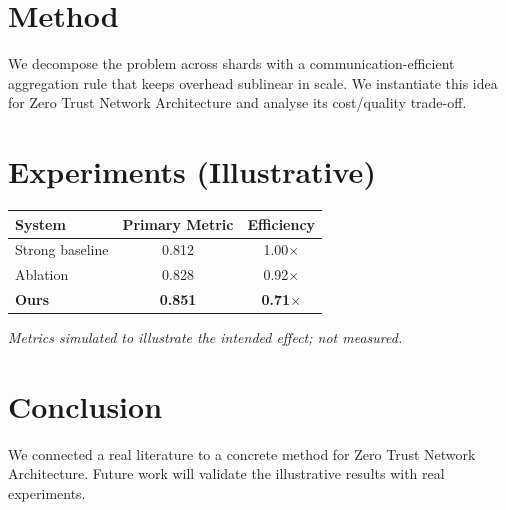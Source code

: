 \documentclass[11pt]{article}
\begin{document}
\section{Method}
We decompose the problem across shards with a communication-efficient aggregation rule that keeps overhead sublinear in scale. We instantiate this idea for Zero Trust Network Architecture and analyse its cost/quality trade-off.

\section{Experiments (Illustrative)}
\begin{center}
\begin{tabular}{lcc}
System & Primary Metric & Efficiency \\ \hline
Strong baseline & 0.812 & 1.00$\times$ \\
Ablation & 0.828 & 0.92$\times$ \\
\textbf{Ours} & \textbf{0.851} & \textbf{0.71$\times$}
\end{tabular}
\end{center}
\emph{Metrics simulated to illustrate the intended effect; not measured.}

\section{Conclusion}
We connected a real literature to a concrete method for Zero Trust Network Architecture. Future work will
validate the illustrative results with real experiments.
\end{document}

